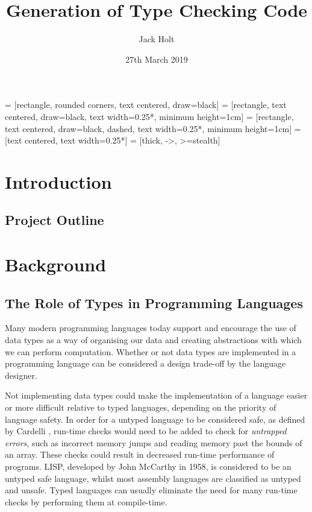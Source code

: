 \documentclass{UoYCSproject}
\title{Generation of Type Checking Code}
\author{Jack Holt}
\date{27th March 2019}
\begin{document}
 = [rectangle, rounded corners, text centered, draw=black]
 = [rectangle, text centered, draw=black,
text width=0.25*\columnwidth, minimum height=1cm]
 = [rectangle, text centered, draw=black, dashed,
text width=0.25*\columnwidth, minimum height=1cm]
 = [text centered, text width=0.25*\columnwidth]
 = [thick, ->, >=stealth]

\maketitle
\listoffigures
{}

\begin{summary}
\end{summary}

\chapter{Introduction}

\section{Project Outline}

\chapter{Background}

\section{The Role of Types in Programming Languages}
Many modern programming languages today support and encourage the use of data
types as a way of organising our data and creating abstractions with which
we can perform computation. Whether or not data types are implemented in a
programming language can be considered a design trade-off by the language
designer.

Not implementing data types could make the implementation of a language easier
or more difficult relative to typed languages, depending on the priority of
language safety. In order for a untyped language to be considered safe, as
defined by Cardelli \cite[p.~3]{CSHandbook}, run-time checks would need to be added
to check for \textit{untrapped errors}, such as incorrect memory jumps and
reading memory past the bounds of an array. These checks could result in
decreased run-time performance of programs. LISP, developed by John McCarthy in
1958, is considered to be an untyped safe language, whilst most assembly
languages are classified as untyped and unsafe. Typed languages can usually
eliminate the need for many run-time checks by performing them at compile-time.
\end{document}
